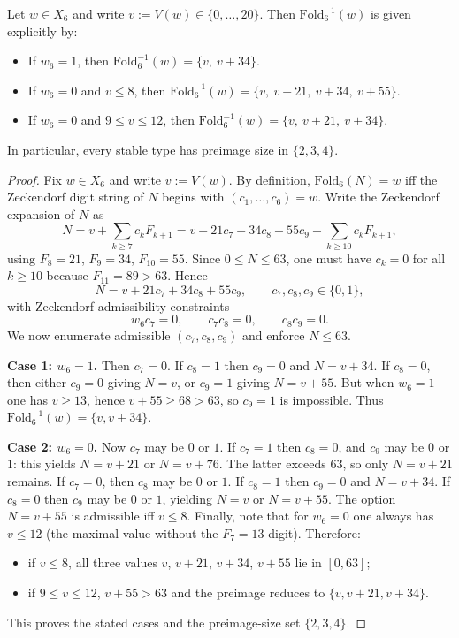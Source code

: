 \begin{lemma}\label{lem:fold6_fiber_explicit}
Let $w\in X_6$ and write $v:=V(w)\in\{0,\dots,20\}$.
Then $\mathrm{Fold}_6^{-1}(w)$ is given explicitly by:
\begin{itemize}
\item If $w_6=1$, then $\mathrm{Fold}_6^{-1}(w)=\{v,\ v+34\}$.
\item If $w_6=0$ and $v\le 8$, then $\mathrm{Fold}_6^{-1}(w)=\{v,\ v+21,\ v+34,\ v+55\}$.
\item If $w_6=0$ and $9\le v\le 12$, then $\mathrm{Fold}_6^{-1}(w)=\{v,\ v+21,\ v+34\}$.
\end{itemize}
In particular, every stable type has preimage size in $\{2,3,4\}$.
\end{lemma}
\begin{proof}
Fix $w\in X_6$ and write $v:=V(w)$.
By definition, $\mathrm{Fold}_6(N)=w$ iff the Zeckendorf digit string of $N$
begins with $(c_1,\ldots,c_6)=w$.
Write the Zeckendorf expansion of $N$ as
\[
N=v+\sum_{k\ge 7} c_k F_{k+1}
=v+21c_7+34c_8+55c_9+\sum_{k\ge 10} c_k F_{k+1},
\]
using $F_8=21$, $F_9=34$, $F_{10}=55$.
Since $0\le N\le 63$, one must have $c_k=0$ for all $k\ge 10$ because
$F_{11}=89>63$.
Hence
\[
N=v+21c_7+34c_8+55c_9,\qquad c_7,c_8,c_9\in\{0,1\},
\]
with Zeckendorf admissibility constraints
\[
w_6c_7=0,\qquad c_7c_8=0,\qquad c_8c_9=0.
\]
We now enumerate admissible $(c_7,c_8,c_9)$ and enforce $N\le 63$.

\medskip
\noindent\textbf{Case 1: $w_6=1$.}
Then $c_7=0$.
If $c_8=1$ then $c_9=0$ and $N=v+34$.
If $c_8=0$, then either $c_9=0$ giving $N=v$, or $c_9=1$ giving $N=v+55$.
But when $w_6=1$ one has $v\ge 13$, hence $v+55\ge 68>63$, so $c_9=1$
is impossible.
Thus $\mathrm{Fold}_6^{-1}(w)=\{v,v+34\}$.

\medskip
\noindent\textbf{Case 2: $w_6=0$.}
Now $c_7$ may be $0$ or $1$.
If $c_7=1$ then $c_8=0$, and $c_9$ may be $0$ or $1$:
this yields $N=v+21$ or $N=v+76$.
The latter exceeds $63$, so only $N=v+21$ remains.
If $c_7=0$, then $c_8$ may be $0$ or $1$.
If $c_8=1$ then $c_9=0$ and $N=v+34$.
If $c_8=0$ then $c_9$ may be $0$ or $1$, yielding $N=v$ or $N=v+55$.
The option $N=v+55$ is admissible iff $v\le 8$.
Finally, note that for $w_6=0$ one always has $v\le 12$ (the maximal value
without the $F_7=13$ digit).
Therefore:
\begin{itemize}
\item if $v\le 8$, all three values $v$, $v+21$, $v+34$, $v+55$ lie in $[0,63]$;
\item if $9\le v\le 12$, $v+55>63$ and the preimage reduces to $\{v,v+21,v+34\}$.
\end{itemize}
This proves the stated cases and the preimage-size set $\{2,3,4\}$.
\end{proof}

